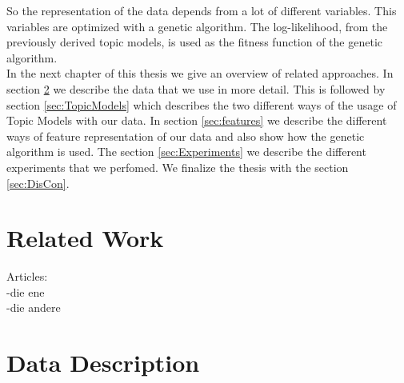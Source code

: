 \documentclass[11pt,a4paper]{article}
\begin{document}
So the representation of the data depends from a lot of different variables. This variables are optimized with a genetic algorithm. The log-likelihood, from the previously derived topic models, is used as the fitness function of the genetic algorithm.\\

In the next chapter of this thesis we give an overview of related approaches. In section \ref{sec:DataDesc} we describe the data that we use in more detail. This is followed by section \ref{sec:TopicModels} which describes the two different ways of the usage of Topic Models with our data. In section \ref{sec:features} we describe the different ways of feature representation of our data and also show how the genetic algorithm is used. The section \ref{sec:Experiments} we describe the different experiments that we perfomed. We finalize the thesis with the section \ref{sec:DisCon}.


% 
% 
% 


\section{Related Work}
Articles:\\
-die ene\\
-die andere


\section{Data Description}
\label{sec:DataDesc}
\end{document}
